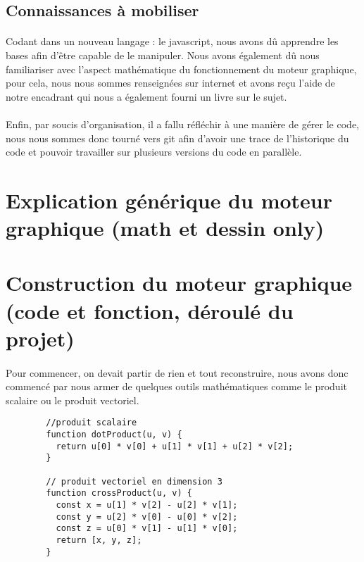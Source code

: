 \subsection{Connaissances à mobiliser}
\paragraph{}
Codant dans un nouveau langage : le javascript, nous avons dû apprendre les bases afin d'être capable de le manipuler.
Nous avons également dû nous familiariser avec l'aspect mathématique du fonctionnement du moteur graphique, pour cela, nous nous sommes renseignées sur internet et avons reçu l'aide de notre encadrant qui nous a également fourni un livre sur le sujet.

\paragraph{}
Enfin, par soucis d'organisation, il a fallu réfléchir à une manière de gérer le code, nous nous sommes donc tourné vers git afin d'avoir une trace de l'historique du code et pouvoir travailler sur plusieurs versions du code en parallèle.

\newpage





\section{Explication générique du moteur graphique (math et dessin only)}


\section{Construction du moteur graphique (code et fonction, déroulé du projet)}
\paragraph{}
Pour commencer, on devait partir de rien et tout reconstruire, nous avons donc commencé par nous armer de quelques outils mathématiques comme le produit scalaire ou le produit vectoriel.

\begin{code}
    \begin{verbatim}
        //produit scalaire 
        function dotProduct(u, v) {
          return u[0] * v[0] + u[1] * v[1] + u[2] * v[2];
        }
        
        // produit vectoriel en dimension 3
        function crossProduct(u, v) {
          const x = u[1] * v[2] - u[2] * v[1];
          const y = u[2] * v[0] - u[0] * v[2];
          const z = u[0] * v[1] - u[1] * v[0];
          return [x, y, z];
        }
    \end{verbatim}
    
    \label{code:crossproduct_and_dotproduct}
\end{code}

